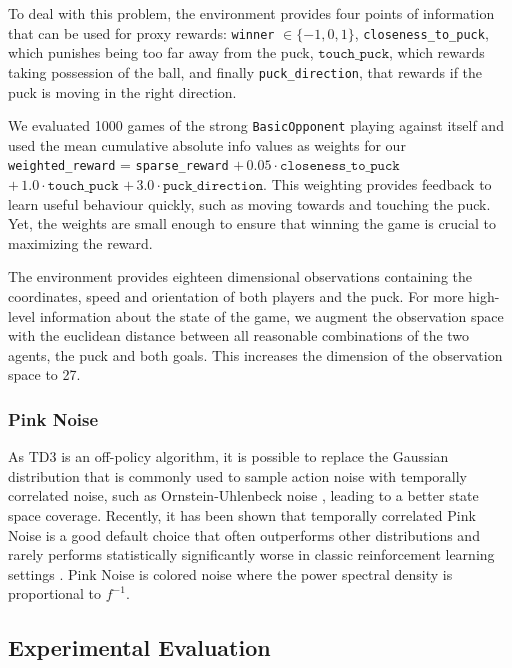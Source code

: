 
To deal with this problem, the environment provides four points of information that can be used for proxy rewards: \texttt{winner} $\in \{-1, 0, 1\}$, \texttt{closeness\_to\_puck}, which punishes being too far away from the puck, $\texttt{touch\_puck}$, which rewards taking possession of the ball, and finally \texttt{puck\_direction}, that rewards if the puck is moving in the right direction.

We evaluated 1000 games of the strong \texttt{BasicOpponent} playing against itself and used the mean cumulative absolute info values as weights for our \texttt{weighted\_reward} = \texttt{sparse\_reward} $+\, 0.05 \cdot \texttt{closeness\_to\_puck}$ $+\, 1.0 \cdot \texttt{touch\_puck}$ $+\, 3.0 \cdot \texttt{puck\_direction}$. This weighting provides feedback to learn useful behaviour quickly, such as moving towards and touching the puck. Yet, the weights are small enough to ensure that winning the game is crucial to maximizing the reward.

The environment provides eighteen dimensional observations containing the coordinates, speed and orientation of both players and the puck. For more high-level information about the state of the game, we augment the observation space with the euclidean distance between all reasonable combinations of the two agents, the puck and both goals. This increases the dimension of the observation space to 27. 

\subsubsection{Pink Noise}

As TD3 is an off-policy algorithm, it is possible to replace the Gaussian distribution that is commonly used to sample action noise with temporally correlated noise, such as Ornstein-Uhlenbeck noise \cite{uhlenbeck30noise}, leading to a better state space coverage. Recently, it has been shown that temporally correlated Pink Noise is a good default choice that often outperforms other distributions and rarely performs statistically significantly worse in classic reinforcement learning settings \cite{eberhard-2023-pink}. Pink Noise is colored noise where the power spectral density is proportional to $f^{-1}$.

\subsection{Experimental Evaluation}\label{subsec:td3_eval}

